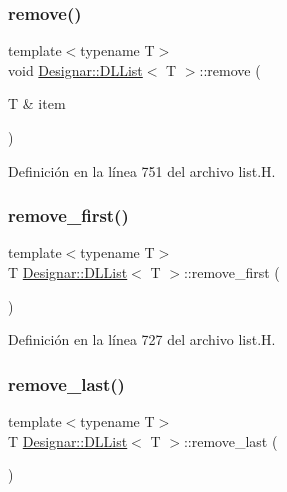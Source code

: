 \subsubsection{\texorpdfstring{remove()}{remove()}}
{\footnotesize\ttfamily template$<$typename T$>$ \\
void \hyperlink{class_designar_1_1_d_l_list}{Designar\+::\+D\+L\+List}$<$ T $>$\+::remove (\begin{DoxyParamCaption}\item[{T \&}]{item }\end{DoxyParamCaption})\hspace{0.3cm}{\ttfamily [inline]}}



Definición en la línea 751 del archivo list.\+H.

\mbox{\label{class_designar_1_1_d_l_list_a62e4c39df6ba191e7cd8dadac70109fb}} 
\subsubsection{\texorpdfstring{remove\+\_\+first()}{remove\_first()}}
{\footnotesize\ttfamily template$<$typename T$>$ \\
T \hyperlink{class_designar_1_1_d_l_list}{Designar\+::\+D\+L\+List}$<$ T $>$\+::remove\+\_\+first (\begin{DoxyParamCaption}{ }\end{DoxyParamCaption})\hspace{0.3cm}{\ttfamily [inline]}}



Definición en la línea 727 del archivo list.\+H.

\mbox{\label{class_designar_1_1_d_l_list_ac64bdba91bd7ff758fbb0e29f50dadcd}} 
\subsubsection{\texorpdfstring{remove\+\_\+last()}{remove\_last()}}
{\footnotesize\ttfamily template$<$typename T$>$ \\
T \hyperlink{class_designar_1_1_d_l_list}{Designar\+::\+D\+L\+List}$<$ T $>$\+::remove\+\_\+last (\begin{DoxyParamCaption}{ }\end{DoxyParamCaption})\hspace{0.3cm}{\ttfamily [inline]}}



